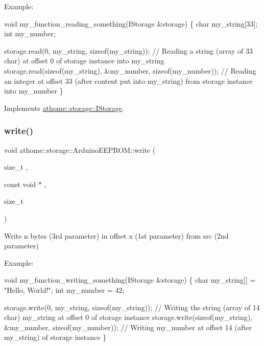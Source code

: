 Example\+:


\begin{DoxyCode}
\textcolor{keywordtype}{void} my\_function\_reading\_something(IStorage &storage) \{
  \textcolor{keywordtype}{char} my\_string[33];
  \textcolor{keywordtype}{int} my\_number;

  storage.read(0, my\_string, \textcolor{keyword}{sizeof}(my\_string)); \textcolor{comment}{// Reading a string (array of 33 char) at offset 0 of
       storage instance into my\_string}
  storage.read(\textcolor{keyword}{sizeof}(my\_string), &my\_number, \textcolor{keyword}{sizeof}(my\_number)); \textcolor{comment}{// Reading an integer at offset 33 (after
       content put into my\_string) from storage instance into my\_number}
\}
\end{DoxyCode}
 

Implements \mbox{\hyperlink{classathome_1_1storage_1_1_i_storage_af623393cdf559addf167463ce4e7005e}{athome\+::storage\+::\+I\+Storage}}.

\mbox{\label{classathome_1_1storage_1_1_arduino_e_e_p_r_o_m_a20027ab8a5b20c1fad3e3e42daafe53d}} 
\subsubsection{\texorpdfstring{write()}{write()}}
{\footnotesize\ttfamily void athome\+::storage\+::\+Arduino\+E\+E\+P\+R\+O\+M\+::write (\begin{DoxyParamCaption}\item[{size\+\_\+t}]{,  }\item[{const void $\ast$}]{,  }\item[{size\+\_\+t}]{ }\end{DoxyParamCaption})\hspace{0.3cm}{\ttfamily [virtual]}}

Write n bytes (3rd parameter) in offset x (1st parameter) from src (2nd parameter)

Example\+:


\begin{DoxyCode}
\textcolor{keywordtype}{void} my\_function\_writing\_something(IStorage &storage) \{
  \textcolor{keywordtype}{char} my\_string[] = \textcolor{stringliteral}{"Hello, World!"};
  \textcolor{keywordtype}{int} my\_number = 42;

  storage.write(0, my\_string, \textcolor{keyword}{sizeof}(my\_string)); \textcolor{comment}{// Writing the string (array of 14 char) my\_string at
       offset 0 of storage instance}
  storage.write(\textcolor{keyword}{sizeof}(my\_string), &my\_number, \textcolor{keyword}{sizeof}(my\_number)); \textcolor{comment}{// Writing my\_number at offset 14 (after
       my\_string) of storage instance}
\}
\end{DoxyCode}
 

